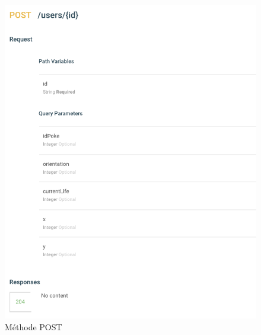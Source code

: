 \documentclass[a4paper,12pt]{article}
\begin{document}
    \begin{figure}[p]
    \includegraphics{POST.png}
    \caption{\label{uml:module}Méthode POST}
    \end{figure}
    
\end{document}
